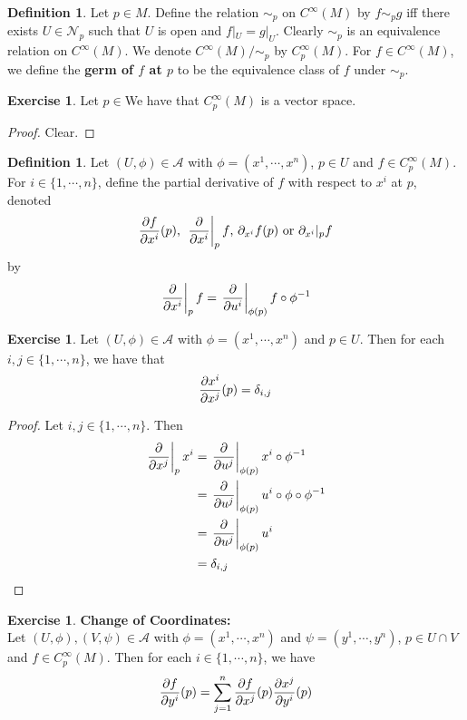 \documentclass[12pt]{amsart}
\theoremstyle{definition}
\newtheorem{defn}[definition]{Definition}
\newtheorem{ex}[definition]{Exercise}
\newcommand{\del}{\delta}
\newcommand{\MA}{\mathcal{A}}
\newcommand{\MN}{\mathcal{N}}
\begin{document}
	\begin{defn}
		Let $p \in M$. Define the relation $\sim_p$ on $C^{\infty}(M)$ by $f \sim_p g$ iff there exists $U \in \MN_p$ such that $U$ is open and $f|_U = g|_U$. Clearly $\sim_p$ is an equivalence relation on $C^{\infty}(M)$. We denote $C^{\infty}(M) / \sim_p$ by $C^{\infty}_p(M)$. For $f \in C^{\infty}(M)$, we define the \textbf{germ of $f$ at $p$} to be the equivalence class of $f$ under $\sim_p$. 
	\end{defn}
	
	\begin{ex}
		Let $p \in $We have that $C_p^{\infty}(M)$ is a vector space.
	\end{ex}
	
	\begin{proof}
		Clear.
	\end{proof}

	\begin{defn}
		Let $(U, \phi) \in \MA$ with $\phi = (x^1, \cdots, x^n)$, $p \in U$ and $f \in C_p^{\infty}(M)$. For $i \in \{1, \cdots, n\}$, define the partial derivative of $f$ with respect to $x^i$ at $p$, denoted $$\frac{\partial f}{\partial x^i} (p) \text{, } \eval{\pdv{x^i}}_{p} f \text{, } \partial_{x^i} f (p) \text{ or } \partial_{x^i}|_p f$$ by $$ \eval{\pdv{x^i}}_{p} f =  \eval{\pdv{u^i}}_{\phi(p)} f \circ \phi^{-1} $$
	\end{defn}

	\begin{ex}
		Let $(U, \phi) \in \MA$ with $\phi = (x^1, \cdots, x^n)$ and $p \in U$. Then for each $i,j \in \{1, \cdots, n\}$, we have that $${\pdv{x^i}{x^j}}(p) = \del_{i,j}$$
	\end{ex}

	\begin{proof}
		Let $i,j \in \{1, \cdots, n\}$. Then 
		\begin{align*}
			\eval{\pdv{x^j}}_{p} x^i 
			&=  \eval{\pdv{u^j}}_{\phi(p)} x^i \circ \phi^{-1} \\
			&= \eval{\pdv{u^j}}_{\phi(p)} u^i \circ \phi \circ \phi^{-1} \\
			&= \eval{\pdv{u^j}}_{\phi(p)} u^i  \\
			&= \del_{i,j}
		\end{align*}
	\end{proof}

	\begin{ex} \textbf{Change of Coordinates:}\\
		Let $(U, \phi), (V, \psi) \in \MA$ with $\phi = (x^1, \cdots, x^n)$ and $\psi = (y^1, \cdots, y^n)$, $p \in U \cap V$ and $f \in C_p^{\infty}(M)$. Then for each $i \in \{1, \cdots, n\}$, we have $${\pdv{f}{y^i}}(p) = \sum_{j =1}^n {\pdv{f}{x^j}}(p)   {\pdv{x^j}{y^i}}(p) $$
	\end{ex}
\end{document}
